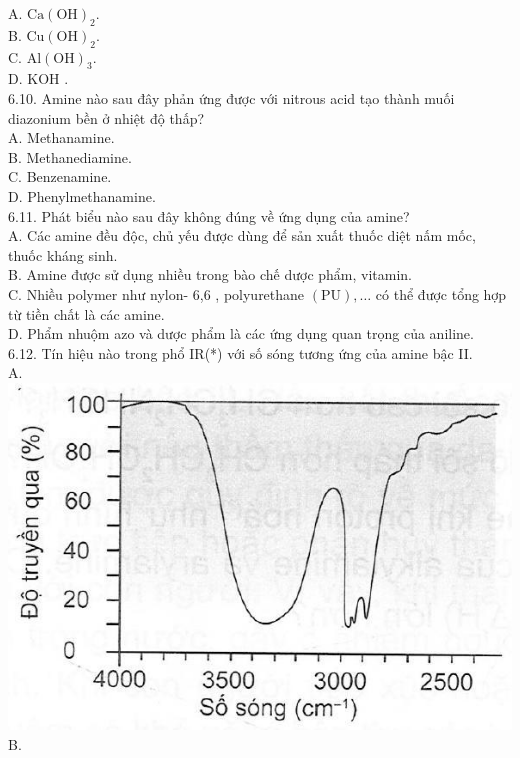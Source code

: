 \documentclass[10pt]{article}
\begin{document}
A. $\mathrm{Ca}(\mathrm{OH})_{2}$.\\
B. $\mathrm{Cu}(\mathrm{OH})_{2}$.\\
C. $\mathrm{Al}(\mathrm{OH})_{3}$.\\
D. KOH .\\
6.10. Amine nào sau đây phản ứng được với nitrous acid tạo thành muối diazonium bền ở nhiệt độ thấp?\\
A. Methanamine.\\
B. Methanediamine.\\
C. Benzenamine.\\
D. Phenylmethanamine.\\
6.11. Phát biểu nào sau đây không đúng về ứng dụng của amine?\\
A. Các amine đều độc, chủ yếu được dùng để sản xuất thuốc diệt nấm mốc, thuốc kháng sinh.\\
B. Amine được sử dụng nhiều trong bào chế dược phẩm, vitamin.\\
C. Nhiều polymer như nylon- 6,6 , polyurethane $(\mathrm{PU}), \ldots$ có thể được tổng hợp từ tiền chất là các amine.\\
D. Phẩm nhuộm azo và dược phẩm là các ứng dụng quan trọng của aniline.\\
6.12. Tín hiệu nào trong phổ IR(*) với số sóng tương ứng của amine bậc II.\\
A.\\
\includegraphics[max width=\textwidth, center]{2025_10_23_de6f5713836e4e91b3c8g-047(3)}\\
B.\\
\end{document}
